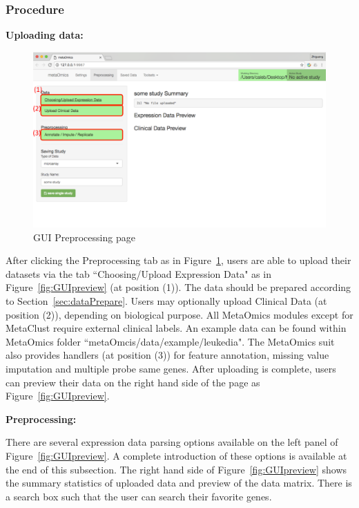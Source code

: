 \subsubsection{Procedure}
\label{sec:procedure}

\begin{steps}
\item \textbf{Uploading data:}

\begin{figure}[!htbp]
\begin{center}
\includegraphics[scale=0.4]{./figure/preprocessing/GUIpreprocessing}
\caption{GUI Preprocessing page}
\label{fig:GUIpreprocessing}
\end{center}
\end{figure}

After clicking the Preprocessing tab as in Figure~\ref{fig:GUIpreprocessing},
users are able to upload their datasets via the tab ``Choosing/Upload Expression Data" as in Figure~\ref{fig:GUIpreview} (at position {\color{red} (1)}).
The data should be prepared according to Section~\ref{sec:dataPrepare}.
Users may optionally upload Clinical Data (at position {\color{red} (2)}), depending on biological purpose.
All MetaOmics modules except for MetaClust  require external clinical labels.
An example data can be found within MetaOmics folder ``metaOmcis/data/example/leukedia".
The MetaOmics suit also provides handlers (at position {\color{red} (3)}) for feature annotation, missing value imputation and multiple probe same genes.
After uploading is complete,
users can preview their data on the right hand side of the page as Figure~\ref{fig:GUIpreview}.

\item \textbf{Preprocessing:}


There are several expression data parsing options available on the left panel of Figure~\ref{fig:GUIpreview}.
A complete introduction of these options is available at the end of this subsection.
The right hand side of Figure~\ref{fig:GUIpreview} shows the summary statistics of uploaded data and preview of the data matrix.
There is a search box such that the user can search their favorite genes.


\end{steps}

